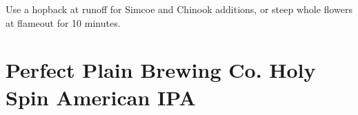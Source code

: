 \documentclass[10pt,oneside]{scrbook}
\begin{document}

\begin{methodandtiming}
 
\begin{mashsteps}
\end{mashsteps}

\begin{fermentationsteps}
\end{fermentationsteps}

\begin{directions}
Use a hopback at runoff for  Simcoe and Chinook additions, or steep whole flowers
at flameout for 10 minutes.
\end{directions}

\end{methodandtiming}

\pagebreak

\begin{ingredientsblock}

\begin{malts}
\end{malts}

\begin{hops}
\end{hops}

\begin{yeasts}
\end{yeasts}

\end{ingredientsblock}

\chapter*{Perfect Plain Brewing Co. Holy Spin American IPA}
\end{document}
